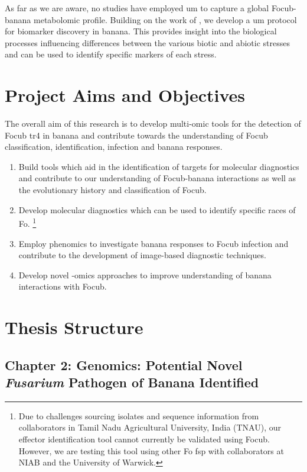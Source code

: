As far as we are aware, no studies have employed \ac{um} to capture a global \ac{Focub}-banana metabolomic profile. Building on the work of \textcite{Sambles2017, Sidda2020}, we develop a \ac{um} protocol for biomarker discovery in banana. This provides insight into the biological processes influencing differences between the various biotic and abiotic stresses  and can be used to identify specific markers of each stress.

\newpage
\section{Project Aims and Objectives}

The overall aim of this research is to develop multi-omic tools for the detection of \acl{Focub} \ac{tr4} in banana and contribute towards the understanding of \acl{Focub} classification, identification, infection and banana responses. 

\begin{enumerate}
    \item Build tools which aid in the identification of targets for molecular diagnostics and contribute to our understanding of \ac{Focub}-banana interactions as well as the evolutionary history and classification of \ac{Focub}. 
    \item Develop molecular diagnostics which can be used to identify specific races of \acl{Fo}. \footnote{Due to challenges sourcing isolates and sequence information from collaborators in Tamil Nadu Agricultural University, India (TNAU), our effector identification tool cannot currently be validated using \ac{Focub}. However, we are testing this tool using other \acl{Fo} \ac{fsp} with collaborators at NIAB and the University of Warwick.}
    \item Employ phenomics to investigate banana responses to \ac{Focub} infection and contribute to the development of image-based diagnostic techniques.  
    \item Develop novel -omics approaches to improve understanding of banana interactions with \ac{Focub}.  
\end{enumerate}

\newpage
\section{Thesis Structure}

\subsection{Chapter 2: Genomics: Potential Novel \textit{Fusarium} Pathogen of Banana Identified} 

